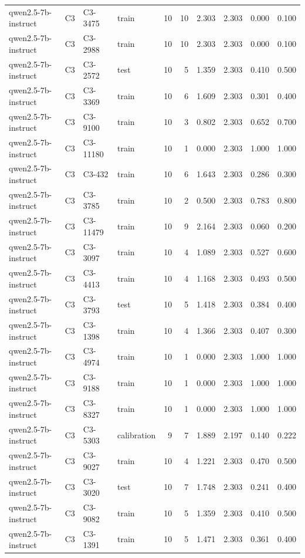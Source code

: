 \begin{table}
\begin{tabular}{llllrrrrrr}
qwen2.5-7b-instruct & C3 & C3-3475 & train & 10 & 10 & 2.303 & 2.303 & 0.000 & 0.100 \\
qwen2.5-7b-instruct & C3 & C3-2988 & train & 10 & 10 & 2.303 & 2.303 & 0.000 & 0.100 \\
qwen2.5-7b-instruct & C3 & C3-2572 & test & 10 & 5 & 1.359 & 2.303 & 0.410 & 0.500 \\
qwen2.5-7b-instruct & C3 & C3-3369 & train & 10 & 6 & 1.609 & 2.303 & 0.301 & 0.400 \\
qwen2.5-7b-instruct & C3 & C3-9100 & train & 10 & 3 & 0.802 & 2.303 & 0.652 & 0.700 \\
qwen2.5-7b-instruct & C3 & C3-11180 & train & 10 & 1 & 0.000 & 2.303 & 1.000 & 1.000 \\
qwen2.5-7b-instruct & C3 & C3-432 & train & 10 & 6 & 1.643 & 2.303 & 0.286 & 0.300 \\
qwen2.5-7b-instruct & C3 & C3-3785 & train & 10 & 2 & 0.500 & 2.303 & 0.783 & 0.800 \\
qwen2.5-7b-instruct & C3 & C3-11479 & train & 10 & 9 & 2.164 & 2.303 & 0.060 & 0.200 \\
qwen2.5-7b-instruct & C3 & C3-3097 & train & 10 & 4 & 1.089 & 2.303 & 0.527 & 0.600 \\
qwen2.5-7b-instruct & C3 & C3-4413 & train & 10 & 4 & 1.168 & 2.303 & 0.493 & 0.500 \\
qwen2.5-7b-instruct & C3 & C3-3793 & test & 10 & 5 & 1.418 & 2.303 & 0.384 & 0.400 \\
qwen2.5-7b-instruct & C3 & C3-1398 & train & 10 & 4 & 1.366 & 2.303 & 0.407 & 0.300 \\
qwen2.5-7b-instruct & C3 & C3-4974 & train & 10 & 1 & 0.000 & 2.303 & 1.000 & 1.000 \\
qwen2.5-7b-instruct & C3 & C3-9188 & train & 10 & 1 & 0.000 & 2.303 & 1.000 & 1.000 \\
qwen2.5-7b-instruct & C3 & C3-8327 & train & 10 & 1 & 0.000 & 2.303 & 1.000 & 1.000 \\
qwen2.5-7b-instruct & C3 & C3-5303 & calibration & 9 & 7 & 1.889 & 2.197 & 0.140 & 0.222 \\
qwen2.5-7b-instruct & C3 & C3-9027 & train & 10 & 4 & 1.221 & 2.303 & 0.470 & 0.500 \\
qwen2.5-7b-instruct & C3 & C3-3020 & test & 10 & 7 & 1.748 & 2.303 & 0.241 & 0.400 \\
qwen2.5-7b-instruct & C3 & C3-9082 & train & 10 & 5 & 1.359 & 2.303 & 0.410 & 0.500 \\
qwen2.5-7b-instruct & C3 & C3-1391 & train & 10 & 5 & 1.471 & 2.303 & 0.361 & 0.400 \\

\end{tabular}
\end{table}
